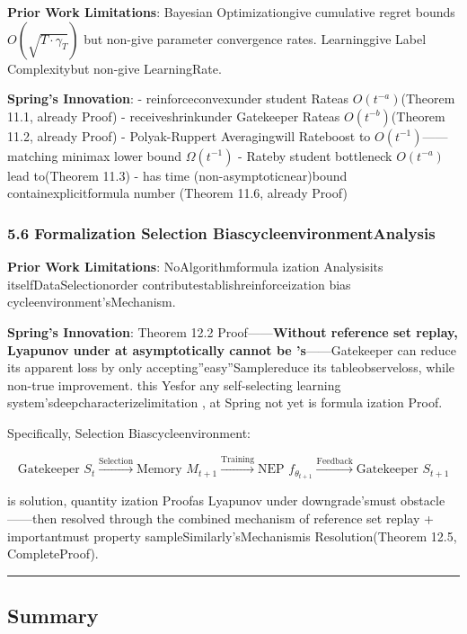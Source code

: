 \documentclass[
  12pt,
]{article}
\begin{document}
\textbf{Prior Work Limitations}: Bayesian Optimizationgive cumulative regret bounds
\(O(\sqrt{T \cdot \gamma_T})\)
but non-give parameter convergence rates. Learninggive Label Complexitybut non-give LearningRate. 

\textbf{Spring's Innovation}: - reinforceconvexunder student Rateas  \(O(t^{-a})\)(Theorem 11.1,
already Proof) - receiveshrinkunder  Gatekeeper Rateas  \(O(t^{-b})\)(Theorem 11.2,
already Proof) - Polyak-Ruppert Averagingwill Rateboost to  \(O(t^{-1})\)------matching
minimax lower bound \(\Omega(t^{-1})\) - Rateby student bottleneck  \(O(t^{-a})\)
lead to(Theorem 11.3) - has time (non-asymptoticnear)bound containexplicitformula number (Theorem 11.6,
already Proof)

\subsubsection{5.6
Formalization Selection BiascycleenvironmentAnalysis}\label{ux5f62ux5f0fux5316ux9009ux62e9ux504fux5deeux5faaux73afux5206ux6790}

\textbf{Prior Work Limitations}:
NoAlgorithmformula ization Analysisits itselfDataSelectionorder contributestablishreinforceization bias cycleenvironment'sMechanism. 

\textbf{Spring's Innovation}: Theorem 12.2
Proof------\textbf{Without reference set replay, Lyapunov
under at asymptotically cannot be 's}------Gatekeeper
can reduce its apparent loss by only accepting''easy''Samplereduce its tableobserveloss, while non-true improvement. this Yesfor any self-selecting learning system'sdeepcharacterizelimitation , at 
Spring not yet is formula ization Proof. 

Specifically, Selection Biascycleenvironment: 

\[\text{Gatekeeper } S_t \xrightarrow{\text{Selection}} \text{Memory } M_{t+1} \xrightarrow{\text{Training}} \text{NEP } f_{\theta_{t+1}} \xrightarrow{\text{Feedback}} \text{Gatekeeper } S_{t+1}\]

is solution, quantity ization Proofas  Lyapunov under downgrade'smust obstacle ------then resolved through the combined mechanism of reference set replay +
importantmust property sampleSimilarly'sMechanismis Resolution(Theorem 12.5, CompleteProof). 

\begin{center}\rule{0.5\linewidth}{0.5pt}\end{center}

\subsection{Summary}\label{ux603bux7ed3}
\end{document}
